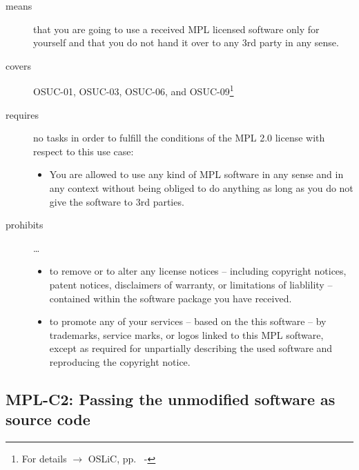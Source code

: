 \begin{description}

\item[means] that you are going to use a received MPL licensed software only
for yourself and that you do not hand it over to any 3rd party in any sense.

\item[covers] OSUC-01, OSUC-03, OSUC-06, and OSUC-09\footnote{For details 
$\rightarrow$ OSLiC, pp.\ \pageref{OSUC-01-DEF} - \pageref{OSUC-09-DEF}}

\item[requires] no tasks in order to fulfill the conditions of the MPL 2.0
license with respect to this use case:
  \begin{itemize}
    \item You are allowed to use any kind of MPL software in any sense and in
    any context without being obliged to do anything as long as you do not
    give the software to 3rd parties.
  \end{itemize}

\item[prohibits] \ldots
\begin{itemize}
  \item to remove or to alter any license notices -- including copyright
  notices, patent notices, disclaimers of warranty, or limitations of liablility
  -- contained within the software package you have received.
  \item to promote any of your services -- based on the this software -- by
  trademarks, service marks, or logos linked to this MPL software, except as
  required for unpartially describing the used software and reproducing the
  copyright notice.
\end{itemize}

\end{description}

\subsection{MPL-C2: Passing the unmodified software as source code}
\label{OSUC-02S-MPL} \label{OSUC-05S-MPL} \label{OSUC-07S-MPL} 

